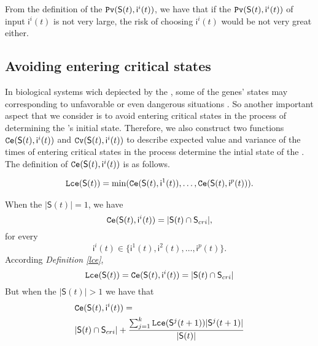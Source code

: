 From the definition of the ${\tt Pv}(\mathsf{S}(t), \mathsf{ i}^{i}(t))$, we have that if the ${\tt Pv}(\mathsf{S}(t), \mathsf{ i}^{i}(t))$ of input $\mathsf{ i}^{i}(t)$ is not very large, the risk of choosing $\mathsf{ i}^{i}(t)$ would be not very great either.
\subsection{Avoiding entering critical states}
In biological systems wich depiected by the \BCNs, some of the genes' states may corresponding to unfavorable or even dangerous situations \cite{Li2014Controllability}. So another important aspect that we consider is to avoid entering critical states in the process of determining the \BCN's initial state. Therefore, we also construct two functions ${\tt Ce}(\mathsf{S}(t), \mathsf{ i}^{i}(t))$ and ${\tt Cv}(\mathsf{S}(t), \mathsf{ i}^{i}(t))$ to describe expected value and variance of the times of entering critical states in the process determine the intial state of the \BCNs. The definition of ${\tt Ce}(\mathsf{S}(t), \mathsf{ i}^{i}(t))$ is as follows.\\
\begin{definition} \label{lce}
\begin{equation}
\begin{split}
{\tt Lce}(\mathsf{S}(t))= \min({\tt Ce}(\mathsf{S}(t), \mathsf{ i}^{1}(t)),\ldots,{\tt Ce}(\mathsf{S}(t), \mathsf{ i}^{p}(t))).
\end{split}
\end{equation}
\end{definition}
\begin{definition} 
When the $|\mathsf{S}(t)|=1$, we have \[{\tt Ce}(\mathsf{S}(t), \mathsf{ i}^{i}(t))=|\mathsf{S}(t) \cap \mathsf{S}_{cri} |,\]  for every \[\mathsf{ i}^{i}(t) \in \{\mathsf{ i}^{1}(t),\mathsf{ i}^{2}(t),\ldots, \mathsf{ i}^{p}(t)\}.\]  
According {\em Definition \ref{lce}}, %
\[{\tt Lce}(\mathsf{S}(t))={\tt Ce}(\mathsf{S}(t), \mathsf{ i}^{i}(t))=|\mathsf{S}(t) \cap \mathsf{S}_{cri} |\] 
But when the $|\mathsf{S}(t)|>1$ 
we have that 
\begin{equation}
\begin{split}
&{\tt Ce}(\mathsf{S}(t), \mathsf{ i}^{i}(t))=\\
&|\mathsf{S}(t) \cap \mathsf{S}_{cri}| +\frac{\sum_{j=1}^k {\tt Lce}(\mathsf{S}^{j}(t+1))|\mathsf{S}^{j}(t+1)|}{ |\mathsf{S}(t)|} 
\end{split}
\end{equation}
\end{definition}

